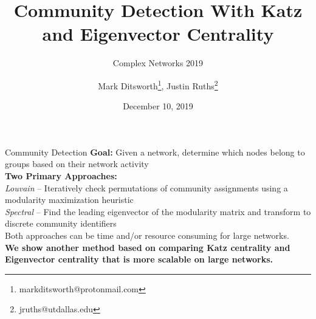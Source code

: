 \documentclass[aspectratio=169,11pt]{beamer}
\title{Community Detection With Katz and Eigenvector Centrality}
\subtitle{Complex Networks 2019}
\author{Mark Ditsworth\thanks{markditsworth@protonmail.com}, Justin Ruths\thanks{jruths@utdallas.edu}}
\institute{University of Texas at Dallas}
\date{December 10, 2019}
\begin{document}
\begin{frame}[plain]
    \maketitle
    
\end{frame}

\begin{frame}{Community Detection}
	\textbf{Goal:} Given a network, determine which nodes belong to groups based on their network activity\\
	\vspace{15pt}
	\textbf{Two Primary Approaches:}\\
	\textit{Louvain} -- Iteratively check permutations of community assignments using a modularity maximization heuristic\cite{louvain}\\
	\textit{Spectral} -- Find the leading eigenvector of the modularity matrix and transform to discrete community identifiers\cite{spectral}\\
	\vspace{15pt}
	Both approaches can be time and/or resource consuming for large networks.\\
	\vspace{15pt}
	\textbf{We show another method based on comparing Katz centrality and Eigenvector centrality that is more scalable on large networks.}
\end{frame}
\end{document}
